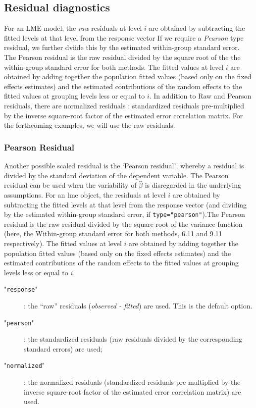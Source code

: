 \documentclass[12pt, a4paper]{report}
\theoremstyle{plain}
\theoremstyle{definition}
\theoremstyle{remark}
\begin{document}
	
	
	
	

	\subsection{Residual diagnostics} %
	
	
	For an LME model, the \textit{raw} residuals at level $i$ are obtained by subtracting the fitted levels at that level from the response vector If we require a \textit{Pearson} type residual, we further dviide this by the estimated within-group standard error. The Pearson residual is the raw residual divided by the square root of the the within-group standard error for both methods. The fitted values at level $i$ are obtained by adding together the population fitted values (based only on the fixed effects estimates) and the estimated contributions of the random effects to the fitted values at grouping levels less or equal to $i$. In addition to Raw and Pearson residuals, there are normalized residuals : standardized residuals pre-multiplied by the inverse square-root factor of the estimated error correlation matrix. For the forthcoming examples, we will use the raw residuals.
		\subsubsection{Pearson Residual}%
		
		Another possible scaled residual is the  `Pearson residual', whereby a residual is divided by the standard deviation of the dependent variable. The Pearson residual can be used when the variability of $\hat{\beta}$ is disregarded in the underlying assumptions.
	\newpage
	For an lme object, the residuals at level $i$ are obtained by subtracting the fitted levels at that level from the response vector (and dividing by the estimated within-group standard error, if \texttt{type="pearson"}).The Pearson residual is the raw residual divided by the square root of the variance function (here, the Within-group standard error for both methods, 6.11 and 9.11 respectively). The fitted values at level $i$ are obtained by adding together the population fitted values (based only on the fixed effects estimates) and the estimated contributions of the random effects to the fitted values at grouping levels less or equal to $i$.
		
		\begin{description}
			\item["\texttt{response}"]: the “raw” residuals (\textit{observed - fitted}) are used. This is the default option.
			\item["\texttt{pearson}"]: the standardized residuals (raw residuals divided by the corresponding standard errors) are used; 
			\item["\texttt{normalized}"]: the normalized residuals (standardized residuals pre-multiplied by the inverse square-root factor of the estimated error correlation matrix) are used.
		\end{description}
\end{document}
